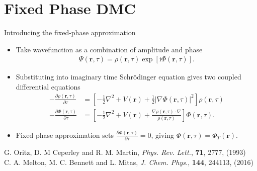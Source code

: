 \documentclass{beamer}
\newcommand{\II}{\mathrm{i}}
\begin{document}
\section{Fixed Phase DMC}
  \begin{frame}{Introducing the fixed-phase approximation}
    \begin{itemize}
     \item Take wavefunction as a combination of amplitude and phase
     \small{
      \begin{align}
\Psi \left(\mathbf{r} , \tau \right) = \rho \left( \mathbf{r} , \tau \right) \exp \left[ \II \Phi \left( \mathbf{r} , \tau \right) \right]. 
      \end{align}
      }
      \item Substituting into imaginary time Schr\"{o}dinger equation gives two coupled differential equations
      \small{
      \begin{align}
        \label{FPDMCr}
        - \frac{\partial \rho \left(\mathbf{r} , \tau \right)}{\partial \tau} &= \left[ -\frac{1}{2} \nabla^2 + V(\mathbf{r}) + \frac{1}{2} | \nabla \Phi \left(\mathbf{r} , \tau \right) |^2 \right] \rho \left(\mathbf{r} , \tau \right) \\
        \label{FPDMCi}
        - \frac{\partial \Phi \left(\mathbf{r} , \tau \right)}{\partial \tau} &= \left[ -\frac{1}{2} \nabla^2 + V(\mathbf{r})  + \frac{\nabla \rho \left(\mathbf{r} , \tau \right) \cdot \nabla }{\rho \left(\mathbf{r} , \tau \right)}  \right] \Phi \left(\mathbf{r} , \tau \right).
      \end{align}
      }
      \item Fixed phase approximation sets $\frac{\partial \Phi \left(\mathbf{r} , \tau \right)}{\partial \tau} = 0$, giving $\Phi(\mathbf{r},\tau) = \Phi_{T}(\mathbf{r})$.
    \end{itemize}
     \vspace{1em}
     \tiny{G. Oritz, D. M Ceperley and R. M. Martin, \textit{Phys. Rev. Lett.}, \textbf{71}, 2777, (1993)\\
     C. A. Melton, M. C. Bennett and L. Mitas, \textit{J. Chem. Phys.}, \textbf{144}, 244113, (2016)
 }%
  \end{frame}
  
\end{document}

